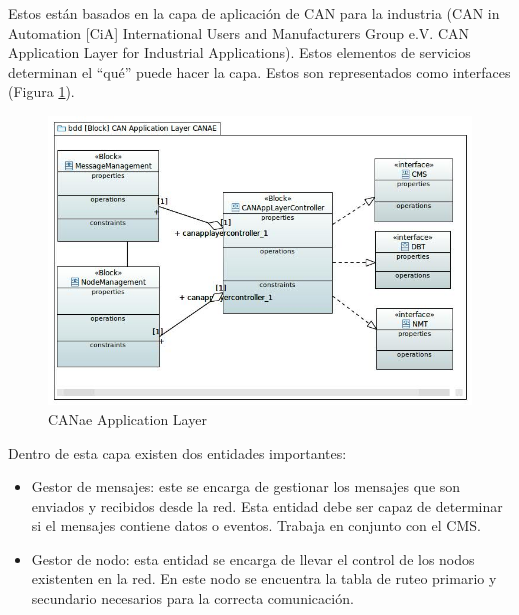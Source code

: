 Estos están basados en la capa de aplicación de CAN para la industria (CAN in Automation [CiA] International Users and Manufacturers Group e.V. CAN Application Layer for Industrial Applications). Estos elementos de servicios determinan el ``qué'' puede hacer la capa. Estos son representados como interfaces (Figura \ref{fig:CANAE_APP_LAYER}).

\begin{figure}[h!]
 \centering
 \includegraphics[scale=0.5]{images/Secciones/AppendixA/CAN_Application_Layer_CANAE.jpg}
 \caption{CANae Application Layer}
\label{fig:CANAE_APP_LAYER}
\end{figure}

Dentro de esta capa existen dos entidades importantes:
\begin{itemize}
\item Gestor de mensajes: este se encarga de gestionar los mensajes que son enviados y recibidos desde la red. Esta entidad debe ser capaz de determinar si el mensajes contiene datos o eventos. Trabaja en conjunto con el CMS.
  
\item Gestor de nodo: esta entidad se encarga de llevar el control de los nodos existenten en la red. En este nodo se encuentra la tabla de ruteo primario y secundario necesarios para la correcta comunicación.
  
\end{itemize}


